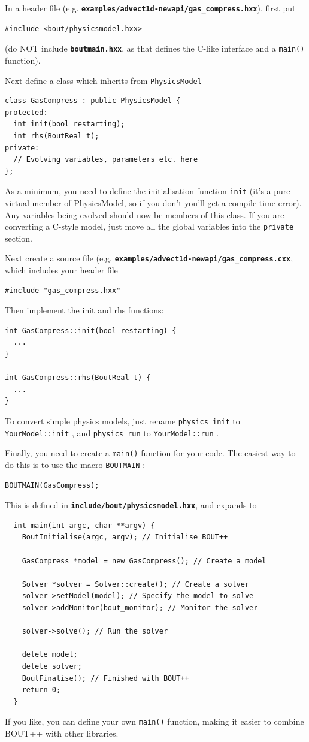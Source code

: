 \documentclass[12pt]{article}
\newcommand{\file}[1]{\texttt{\bf #1}}
\begin{document}
In a header file (e.g. \file{examples/advect1d-newapi/gas\_compress.hxx}),
first put
%
\begin{lstlisting}
#include <bout/physicsmodel.hxx>
\end{lstlisting}
%
(do NOT include \file{boutmain.hxx}, as that defines the C-like interface and a
%
\lstinline!main()!
%
 function).

Next define a class which inherits from
%
\lstinline!PhysicsModel!
%
\begin{lstlisting}
class GasCompress : public PhysicsModel {
protected:
  int init(bool restarting);
  int rhs(BoutReal t);
private:
  // Evolving variables, parameters etc. here
};
\end{lstlisting}
%
As a minimum, you need to define the initialisation function
%
\lstinline!init!
%
 (it's a pure virtual member of PhysicsModel, so if you don't you'll get a
 compile-time error). Any variables being evolved should now be members of this
 class. If you are converting a C-style model, just move all the global
 variables into the
%
\lstinline!private!
%
 section.

Next create a source file (e.g.
\file{examples/advect1d-newapi/gas\_compress.cxx}, which includes your header
file
%
\begin{lstlisting}
#include "gas_compress.hxx"
\end{lstlisting}
%
Then implement the init and rhs functions:
%
\begin{lstlisting}
int GasCompress::init(bool restarting) {
  ...
}

int GasCompress::rhs(BoutReal t) {
  ...
}
\end{lstlisting}
%
To convert simple physics models, just rename
%
\lstinline!physics_init! to \lstinline!YourModel::init!
%
, and
%
\lstinline!physics_run! to \lstinline!YourModel::run!
%
.

Finally, you need to create a
%
\lstinline!main()!
%
 function for your code. The easiest way to do this is to use the macro
%
\lstinline!BOUTMAIN!
%
:
%
\begin{lstlisting}
BOUTMAIN(GasCompress);
\end{lstlisting}
%
This is defined in \file{include/bout/physicsmodel.hxx}, and expands to
%
\begin{lstlisting}
  int main(int argc, char **argv) {
    BoutInitialise(argc, argv); // Initialise BOUT++

    GasCompress *model = new GasCompress(); // Create a model

    Solver *solver = Solver::create(); // Create a solver
    solver->setModel(model); // Specify the model to solve
    solver->addMonitor(bout_monitor); // Monitor the solver

    solver->solve(); // Run the solver

    delete model;
    delete solver;
    BoutFinalise(); // Finished with BOUT++
    return 0;
  }
\end{lstlisting}
%
If you like, you can define your own
%
\lstinline!main()!
%
 function, making it easier to combine BOUT++ with other libraries.
\end{document}
